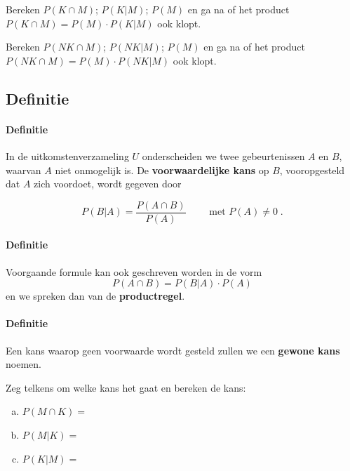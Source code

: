\documentclass[12pt,twoside]{article}
\begin{document}
\begin{oefening}
Bereken $P(K\cap M)$; $P(K|M)$; $P(M)$ en ga na of het product $P(K\cap M)=P(M)\cdot P(K|M)$ ook klopt.
\end{oefening}

\begin{oefening}
Bereken $P(NK\cap M)$; $P(NK|M)$; $P(M)$ en ga na of het product $P(NK\cap M)=P(M)\cdot P(NK|M)$ ook klopt.
\end{oefening}

\subsection{Definitie}

\paragraph*{Definitie}
In de uitkomstenverzameling $U$ onderscheiden we twee gebeurtenissen $A$ en $B$, waarvan $A$ niet onmogelijk is. De {\bf voorwaardelijke kans} op $B$, vooropgesteld dat $A$ zich voordoet, wordt gegeven door\\
\begin{mdframed}
$$P(B|A)=\dfrac{P(A\cap B)}{P(A)}\qquad\mbox{ met }P(A)\neq 0\;.$$
\end{mdframed}

\paragraph*{Definitie}
Voorgaande formule kan ook geschreven worden in de vorm
$$P(A\cap B)=P(B|A)\cdot P(A)$$
en we spreken dan van de {\bf productregel}.

\paragraph*{Definitie} Een kans waarop geen voorwaarde wordt gesteld zullen we een {\bf gewone kans} noemen.

\begin{oefening}
Zeg telkens om welke kans het gaat en bereken de kans:
\begin{enumerate}[(a)]
  \item $P(M\cap K)=$\arulefill
  \item $P(M|K)=$\arulefill
  \item $P(K|M)=$\arulefill
\end{enumerate}
\end{oefening}
\end{document}
